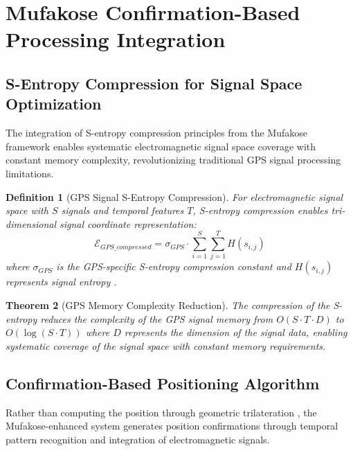 \documentclass[12pt,a4paper]{article}
\newtheorem{theorem}{Theorem}[section]
\newtheorem{definition}[theorem]{Definition}
\begin{document}
\section{Mufakose Confirmation-Based Processing Integration}

\subsection{S-Entropy Compression for Signal Space Optimization}

The integration of S-entropy compression principles from the Mufakose framework \cite{sachikonye2025mufakose} enables systematic electromagnetic signal space coverage with constant memory complexity, revolutionizing traditional GPS signal processing limitations.

\begin{definition}[GPS Signal S-Entropy Compression]
For electromagnetic signal space with $S$ signals and temporal features $T$, S-entropy compression enables tri-dimensional signal coordinate representation:
\begin{equation}
\mathcal{E}_{GPS\_compressed} = \sigma_{GPS} \cdot \sum_{i=1}^{S} \sum_{j=1}^{T} H(s_{i,j})
\end{equation}
where $\sigma_{GPS}$ is the GPS-specific S-entropy compression constant and $H(s_{i,j})$ represents signal entropy \cite{shannon1948}.
\end{definition}

\begin{theorem}[GPS Memory Complexity Reduction]
The compression of the S-entropy reduces the complexity of the GPS signal memory from $O(S \cdot T \cdot D)$ to $O(\log(S \cdot T))$ where $D$ represents the dimension of the signal data, enabling systematic coverage of the signal space with constant memory requirements.
\end{theorem}

\subsection{Confirmation-Based Positioning Algorithm}

Rather than computing the position through geometric trilateration \cite{misra2006}, the Mufakose-enhanced system generates position confirmations through temporal pattern recognition and integration of electromagnetic signals.
\end{document}

